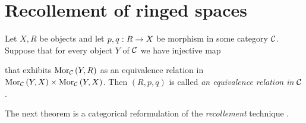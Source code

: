 \section{Recollement of ringed spaces}

\begin{definition}
Let $X, R$ be objects and let $p,q:R\rightarrow X$ be morphism in some category ${\mathcal C}$. Suppose that for every object $Y$ of ${\mathcal C}$ we have injective map
\begin{center}
\end{center}
that exhibits $\mathrm{Mor}_{{\mathcal C}}\left(Y,R\right)$ as an equivalence relation in $\mathrm{Mor}_{{\mathcal C}}\left(Y,X\right)\times \mathrm{Mor}_{{\mathcal C}}\left(Y,X\right)$. Then $(R,p,q)$ is called \textit{an equivalence relation in ${\mathcal C}$}.
\end{definition}
\noindent
The next theorem is a categorical reformulation of the \textit{recollement} technique {\cite[Chapitre 0, 4.1.7]{EGA1new}}.

